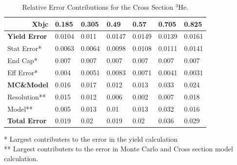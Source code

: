 \documentclass[12pt,usenames,dvipsnames]{beamer}
\begin{document}
\begin{frame}{}

\begin{table}[]
	\caption*{Relative Error Contributions for the Cross Section $^3$He.}
	\begin{tabular}{|p{2.2cm}|l|l|l|l|l|l|}
\hline
\multicolumn{1}{|r|}{\textbf{Xbjc}} & \textbf{0.185} & \textbf{0.305} & \textbf{0.49} & \textbf{0.57} & \textbf{0.705} & \textbf{0.825} \\ \hline
\textbf{Yield Error}                & 0.0104         & 0.011          & 0.0147        & 0.0149        & 0.0139         & 0.0161         \\ \hline
Stat Error*                            & 0.0063         & 0.0064         & 0.0098        & 0.0108        & 0.0111         & 0.0141         \\ \hline
End Cap*                             & 0.007          & 0.007          & 0.007         & 0.007         & 0.007          & 0.007          \\ \hline
Eff Error*                           & 0.004          & 0.0051         & 0.0083        & 0.0071        & 0.0041         & 0.0031         \\ \hline
\hline
\textbf{MC\&Model}                  & 0.016          & 0.017          & 0.012         & 0.013         & 0.033          & 0.024          \\ \hline
Resolution**                          & 0.015          & 0.012          & 0.006         & 0.002         & 0.007          & 0.018          \\ \hline
Model**                               & 0.005          & 0.013          & 0.01          & 0.013         & 0.032          & 0.016          \\ \hline
\hline
\textbf{Total Error}                & 0.019          & 0.02           & 0.019         & 0.02          & 0.036          & 0.029          \\ \hline
\end{tabular}
	* Largest contributers to the error in the yield calculation\\
	** Largest contributers to the error in Monte Carlo and Cross section model calculation. 
\end{table}
\end{frame}
\end{document}
